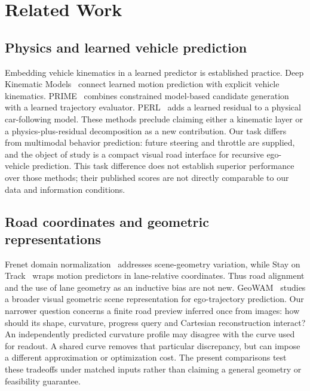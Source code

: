 \documentclass[preprint,12pt]{elsarticle}
\begin{document}
\section{Related Work}\label{sec:related}
\subsection{Physics and learned vehicle prediction}\label{sec:rw_traj}\label{sec:rw_phys}
Embedding vehicle kinematics in a learned predictor is established practice.
Deep Kinematic Models~\cite{cui2020deep} connect learned motion prediction with
explicit vehicle kinematics. PRIME~\cite{song2022prime} combines constrained
model-based candidate generation with a learned trajectory evaluator. PERL~\cite{long2024perl}
adds a learned residual to a physical car-following model. These methods preclude
claiming either a kinematic layer or a physics-plus-residual decomposition as a
new contribution. Our task differs from multimodal behavior prediction: future
steering and throttle are supplied, and the object of study is a compact visual
road interface for recursive ego-vehicle prediction. This task difference does
not establish superior performance over those methods; their published scores
are not directly comparable to our data and information conditions.

\subsection{Road coordinates and geometric representations}\label{sec:rw_po}
Frenet domain normalization~\cite{ye2023frenet} addresses scene-geometry variation,
while Stay on Track~\cite{hallgarten2024stay} wraps motion predictors in
lane-relative coordinates. Thus road alignment and the use of lane geometry as
an inductive bias are not new. GeoWAM~\cite{lu2026geowam} studies a broader visual
geometric scene representation for ego-trajectory prediction. Our narrower
question concerns a finite road preview inferred once from images: how should
its shape, curvature, progress query and Cartesian reconstruction interact?
An independently predicted curvature profile may disagree with the curve used
for readout. A shared curve removes that particular discrepancy, but can impose
a different approximation or optimization cost. The present comparisons test
these tradeoffs under matched inputs rather than claiming a general geometry
or feasibility guarantee.
\end{document}
